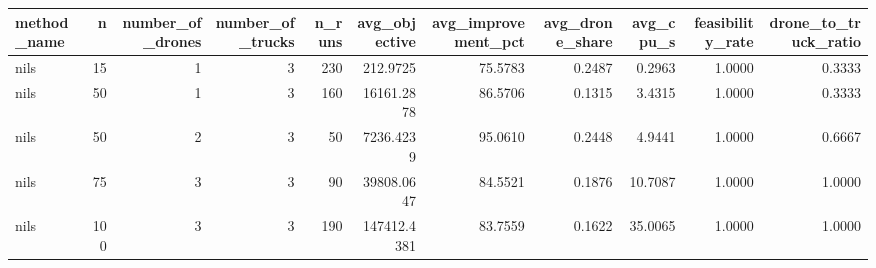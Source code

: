 \begin{tabular}{lrrrrrrrrrr}
\toprule
method_name & n & number_of_drones & number_of_trucks & n_runs & avg_objective & avg_improvement_pct & avg_drone_share & avg_cpu_s & feasibility_rate & drone_to_truck_ratio \\
\midrule
nils & 15 & 1 & 3 & 230 & 212.9725 & 75.5783 & 0.2487 & 0.2963 & 1.0000 & 0.3333 \\
nils & 50 & 1 & 3 & 160 & 16161.2878 & 86.5706 & 0.1315 & 3.4315 & 1.0000 & 0.3333 \\
nils & 50 & 2 & 3 & 50 & 7236.4239 & 95.0610 & 0.2448 & 4.9441 & 1.0000 & 0.6667 \\
nils & 75 & 3 & 3 & 90 & 39808.0647 & 84.5521 & 0.1876 & 10.7087 & 1.0000 & 1.0000 \\
nils & 100 & 3 & 3 & 190 & 147412.4381 & 83.7559 & 0.1622 & 35.0065 & 1.0000 & 1.0000 \\
\bottomrule
\end{tabular}
